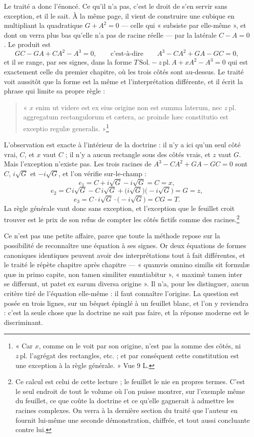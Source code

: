 \documentclass[11pt,a4paper]{article}
\begin{document}
Le traité a donc l'énoncé. Ce qu'il n'a pas, c'est le droit de s'en servir sans
exception, et il le sait. À la même page, il vient de construire une cubique en
multipliant la quadratique $G + A^2 = 0$ — celle qui « subsiste par elle-même »,
et dont on verra plus bas qu'elle n'a pas de racine réelle — par la latérale
$C - A = 0$. Le produit est
\[ GC - GA + CA^2 - A^3 = 0, \qquad \text{c'est-à-dire} \qquad A^3 - CA^2 + GA - GC = 0, \]
et il se range, par ses signes, dans la forme
$T\,\mathrm{Sol.} - z\,\mathrm{pl.}\,A + xA^2 - A^3 = 0$ qui est exactement celle
du premier chapitre, où les trois côtés sont au-dessus. Le traité voit aussitôt
que la forme est la même et l'interprétation différente, et il écrit la phrase
qui limite sa propre règle :

\begin{quote}
« $x$ enim ut videre est ex eius origine non est summa laterum, nec
$z\,\mathrm{pl.}$ aggregatum rectangulorum et cætera, ac proinde hæc constitutio
est exceptio regulæ generalis. »\footnote{« Car $x$, comme on le voit par son
origine, n'est pas la somme des côtés, ni $z\,\mathrm{pl.}$ l'agrégat des
rectangles, etc. ; et par conséquent cette constitution est une exception à la
règle générale. » Vue 9 L.}
\end{quote}

L'observation est exacte à l'intérieur de la doctrine : il n'y a ici qu'un seul
côté vrai, $C$, et $x$ vaut $C$ ; il n'y a aucun rectangle sous des côtés vrais,
et $z$ vaut $G$. Mais l'exception n'existe pas. Les trois racines de
$A^3 - CA^2 + GA - GC = 0$ sont $C$, $i\sqrt{G}$ et $-i\sqrt{G}$, et l'on vérifie
sur-le-champ :
\[ e_1 = C + i\sqrt{G} - i\sqrt{G} = C = x, \]
\[ e_2 = C\,i\sqrt{G} - C\,i\sqrt{G} + \bigl(i\sqrt{G}\bigr)\bigl(-i\sqrt{G}\bigr) = G = z, \]
\[ e_3 = C \cdot i\sqrt{G} \cdot \bigl(-i\sqrt{G}\bigr) = CG = T. \]
La règle générale vaut donc sans exception, et l'exception que le feuillet croit
trouver est le prix de son refus de compter les côtés fictifs comme des
racines.\footnote{Ce calcul est celui de cette lecture ; le feuillet le nie en
propres termes. C'est le seul endroit de tout le volume où l'on puisse montrer,
sur l'exemple même du feuillet, ce que coûte la doctrine et ce qu'elle gagnerait
à admettre les racines complexes. On verra à la dernière section du traité que
l'auteur en fournit lui-même une seconde démonstration, chiffrée, et tout aussi
concluante contre lui.}

Ce n'est pas une petite affaire, parce que toute la méthode repose sur la
possibilité de reconnaître une équation à ses signes. Or deux équations de
formes canoniques identiques peuvent avoir des interprétations tout à fait
différentes, et le traité le répète chapitre après chapitre — « quamvis omnino
similis sit formulæ quæ in primo capite, non tamen similiter enuntiabitur »,
« maximè tamen inter se differunt, ut patet ex earum diversa origine ». Il n'a,
pour les distinguer, aucun critère tiré de l'équation elle-même : il faut
connaître l'origine. La question est posée en trois lignes, sur un béquet
épinglé à un feuillet blanc, et l'on y reviendra : c'est la seule chose que la
doctrine ne sait pas faire, et la réponse moderne est le discriminant.
\end{document}
